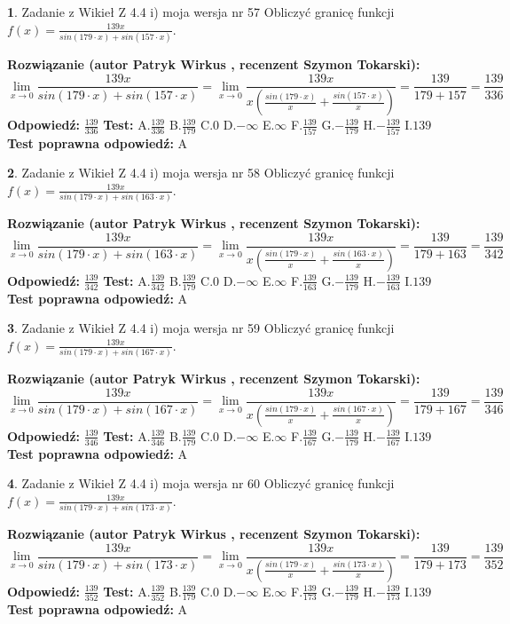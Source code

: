 \documentclass[12pt, a4paper]{article}
\theoremstyle{definition} %
\newtheorem{zad}{}
\newcommand{\zadStart}[1]{\begin{zad}#1\newline}
\newcommand{\zadStop}{\end{zad}}
\newcommand{\rozwStart}[2]{\noindent \textbf{Rozwiązanie (autor #1 , recenzent #2): }\newline}
\newcommand{\rozwStop}{\newline}
\newcommand{\odpStart}{\noindent \textbf{Odpowiedź:}\newline}
\newcommand{\odpStop}{\newline}
\newcommand{\testStart}{\noindent \textbf{Test:}\newline}
\newcommand{\testStop}{\newline}
\newcommand{\kluczStart}{\noindent \textbf{Test poprawna odpowiedź:}\newline}
\newcommand{\kluczStop}{\newline}
\begin{document}
\zadStart{Zadanie z Wikieł Z 4.4 i) moja wersja nr 57}
Obliczyć granicę funkcji $f(x)=\frac{139x}{sin(179\cdot x) +sin(157\cdot x)}$.
\zadStop
\rozwStart{Patryk Wirkus}{Szymon Tokarski}
$$\lim\limits_{x\to 0}\frac{139x}{sin(179\cdot x) +sin(157\cdot x)}=\lim\limits_{x\to 0}\frac{139x}{x(\frac{sin(179\cdot x)}{x}+\frac{sin(157\cdot x)}{x})}=\frac{139}{179+157} = \frac{139}{336}$$
\rozwStop
\odpStart
$\frac{139}{336}$
\odpStop
\testStart
A.$\frac{139}{336}$
B.$\frac{139}{179}$
C.$0$
D.$-\infty$
E.$\infty$
F.$\frac{139}{157}$
G.$-\frac{139}{179}$
H.$-\frac{139}{157}$
I.$139$
\testStop
\kluczStart
A
\kluczStop



\zadStart{Zadanie z Wikieł Z 4.4 i) moja wersja nr 58}
Obliczyć granicę funkcji $f(x)=\frac{139x}{sin(179\cdot x) +sin(163\cdot x)}$.
\zadStop
\rozwStart{Patryk Wirkus}{Szymon Tokarski}
$$\lim\limits_{x\to 0}\frac{139x}{sin(179\cdot x) +sin(163\cdot x)}=\lim\limits_{x\to 0}\frac{139x}{x(\frac{sin(179\cdot x)}{x}+\frac{sin(163\cdot x)}{x})}=\frac{139}{179+163} = \frac{139}{342}$$
\rozwStop
\odpStart
$\frac{139}{342}$
\odpStop
\testStart
A.$\frac{139}{342}$
B.$\frac{139}{179}$
C.$0$
D.$-\infty$
E.$\infty$
F.$\frac{139}{163}$
G.$-\frac{139}{179}$
H.$-\frac{139}{163}$
I.$139$
\testStop
\kluczStart
A
\kluczStop



\zadStart{Zadanie z Wikieł Z 4.4 i) moja wersja nr 59}
Obliczyć granicę funkcji $f(x)=\frac{139x}{sin(179\cdot x) +sin(167\cdot x)}$.
\zadStop
\rozwStart{Patryk Wirkus}{Szymon Tokarski}
$$\lim\limits_{x\to 0}\frac{139x}{sin(179\cdot x) +sin(167\cdot x)}=\lim\limits_{x\to 0}\frac{139x}{x(\frac{sin(179\cdot x)}{x}+\frac{sin(167\cdot x)}{x})}=\frac{139}{179+167} = \frac{139}{346}$$
\rozwStop
\odpStart
$\frac{139}{346}$
\odpStop
\testStart
A.$\frac{139}{346}$
B.$\frac{139}{179}$
C.$0$
D.$-\infty$
E.$\infty$
F.$\frac{139}{167}$
G.$-\frac{139}{179}$
H.$-\frac{139}{167}$
I.$139$
\testStop
\kluczStart
A
\kluczStop



\zadStart{Zadanie z Wikieł Z 4.4 i) moja wersja nr 60}
Obliczyć granicę funkcji $f(x)=\frac{139x}{sin(179\cdot x) +sin(173\cdot x)}$.
\zadStop
\rozwStart{Patryk Wirkus}{Szymon Tokarski}
$$\lim\limits_{x\to 0}\frac{139x}{sin(179\cdot x) +sin(173\cdot x)}=\lim\limits_{x\to 0}\frac{139x}{x(\frac{sin(179\cdot x)}{x}+\frac{sin(173\cdot x)}{x})}=\frac{139}{179+173} = \frac{139}{352}$$
\rozwStop
\odpStart
$\frac{139}{352}$
\odpStop
\testStart
A.$\frac{139}{352}$
B.$\frac{139}{179}$
C.$0$
D.$-\infty$
E.$\infty$
F.$\frac{139}{173}$
G.$-\frac{139}{179}$
H.$-\frac{139}{173}$
I.$139$
\testStop
\kluczStart
A
\kluczStop
\end{document}
